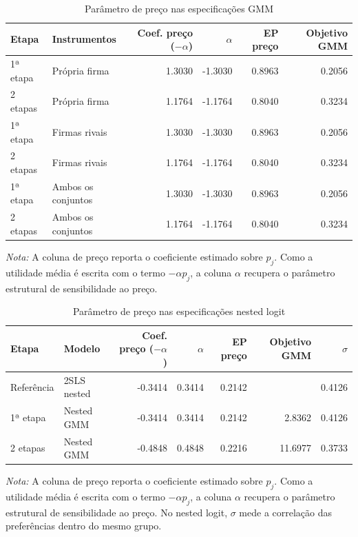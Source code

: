 
\begingroup
\begin{table}[H]
\centering
\caption{Parâmetro de preço nas especificações GMM}
\label{tab:preco-gmm}
\small
\begin{tabular}{llrrrr}
\toprule
Etapa & Instrumentos & Coef. preço ($-\alpha$) & $\alpha$ & EP preço & Objetivo GMM \\
\midrule
1ª etapa & Própria firma & 1.3030 & -1.3030 & 0.8963 & 0.2056 \\
2 etapas & Própria firma & 1.1764 & -1.1764 & 0.8040 & 0.3234 \\
1ª etapa & Firmas rivais & 1.3030 & -1.3030 & 0.8963 & 0.2056 \\
2 etapas & Firmas rivais & 1.1764 & -1.1764 & 0.8040 & 0.3234 \\
1ª etapa & Ambos os conjuntos & 1.3030 & -1.3030 & 0.8963 & 0.2056 \\
2 etapas & Ambos os conjuntos & 1.1764 & -1.1764 & 0.8040 & 0.3234 \\
\bottomrule
\end{tabular}

\vspace{0.3em}
\footnotesize
\textit{Nota:} A coluna de preço reporta o coeficiente estimado sobre $p_j$. Como a utilidade média é escrita com o termo $-\alpha p_j$, a coluna $\alpha$ recupera o parâmetro estrutural de sensibilidade ao preço.
\end{table}
\endgroup


\begingroup
\begin{table}[H]
\centering
\caption{Parâmetro de preço nas especificações nested logit}
\label{tab:preco-nested-logit}
\small
\begin{tabular}{llrrrrr}
\toprule
Etapa & Modelo & Coef. preço ($-\alpha$) & $\alpha$ & EP preço & Objetivo GMM & $\sigma$ \\
\midrule
Referência & 2SLS nested & -0.3414 & 0.3414 & 0.2142 &  & 0.4126 \\
1ª etapa & Nested GMM & -0.3414 & 0.3414 & 0.2142 & 2.8362 & 0.4126 \\
2 etapas & Nested GMM & -0.4848 & 0.4848 & 0.2216 & 11.6977 & 0.3733 \\
\bottomrule
\end{tabular}

\vspace{0.3em}
\footnotesize
\textit{Nota:} A coluna de preço reporta o coeficiente estimado sobre $p_j$. Como a utilidade média é escrita com o termo $-\alpha p_j$, a coluna $\alpha$ recupera o parâmetro estrutural de sensibilidade ao preço. No nested logit, $\sigma$ mede a correlação das preferências dentro do mesmo grupo.
\end{table}
\endgroup
